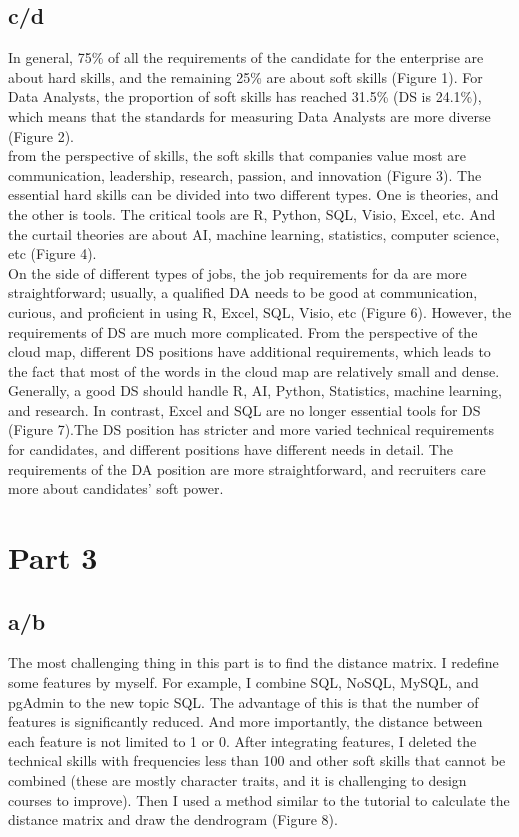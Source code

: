 \documentclass[10pt,onecolumn,letterpaper]{article}
\begin{document}
\subsection*{c/d}
In general, 75\% of all the requirements of the candidate for the enterprise are about hard skills, and the remaining 25\% are about soft skills (Figure 1). For Data Analysts, the proportion of soft skills has reached 31.5\% (DS is 24.1\%), which means that the standards for measuring Data Analysts are more diverse (Figure 2).\\

\noindent from the perspective of skills, the soft skills that companies value most are communication, leadership, research, passion, and innovation (Figure 3). The essential hard skills can be divided into two different types. One is theories, and the other is tools. The critical tools are R, Python, SQL, Visio, Excel, etc. And the curtail theories are about AI, machine learning, statistics, computer science, etc (Figure 4).\\

\noindent On the side of different types of jobs, the job requirements for da are more straightforward; usually, a qualified DA needs to be good at communication, curious, and proficient in using R, Excel, SQL, Visio, etc (Figure 6). However, the requirements of DS are much more complicated. From the perspective of the cloud map, different DS positions have additional requirements, which leads to the fact that most of the words in the cloud map are relatively small and dense. Generally, a good DS should handle R, AI, Python, Statistics, machine learning, and research. In contrast, Excel and SQL are no longer essential tools for DS (Figure 7).The DS position has stricter and more varied technical requirements for candidates, and different positions have different needs in detail. The requirements of the DA position are more straightforward, and recruiters care more about candidates' soft power.

\section*{Part 3}
\subsection*{a/b}
The most challenging thing in this part is to find the distance matrix. I redefine some features by myself. For example, I combine SQL, NoSQL, MySQL, and pgAdmin to the new topic SQL. The advantage of this is that the number of features is significantly reduced. And more importantly, the distance between each feature is not limited to 1 or 0. After integrating features, I deleted the technical skills with frequencies less than 100 and other soft skills that cannot be combined (these are mostly character traits, and it is challenging to design courses to improve). Then I used a method similar to the tutorial to calculate the distance matrix and draw the dendrogram (Figure 8).\\
\end{document}
